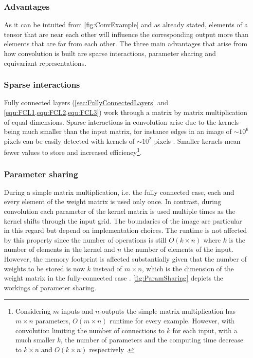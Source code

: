 \subsubsection{Advantages}
As it can be intuited from \cref{fig:ConvExample} and as already stated, elements of a tensor that are near each other will influence the corresponding output more than elements that are far from each other. The three main advantages that arise from how convolution is built are sparse interactions, parameter sharing and equivariant representations. 
\subsubsection{Sparse interactions}
Fully connected layers (\cref{sec:FullyConnectedLayers} and \cref{equ:FCL1,equ:FCL2,equ:FCL3}) work through a matrix by matrix multiplication of equal dimensions. Sparse interactions in convolution arise due to the kernels being much smaller than the input matrix, for instance edges in an image of $\sim10^6$ pixels can be easily detected with kernels of $\sim10^2$ pixels \citep{Goodfellow2016}. Smaller kernels mean fewer values to store and increased efficiency\footnote{Considering $m$ inputs and $n$ outputs the simple matrix multiplication has $m\times n$ parameters, $O(m \times n)$ runtime for every example. However, with convolution limiting the number of connections to $k$ for each input, with a much smaller $k$, the number of parameters and the computing time decrease to $k\times n$ and $O(k\times n)$ respectively \citep{Goodfellow2016}.}.

\subsubsection{Parameter sharing}
During a simple matrix multiplication, i.e. the fully connected case, each and every element of the weight matrix is used only once. In contrast, during convolution each parameter of the kernel matrix is used multiple times as the kernel shifts through the input grid. The boundaries of the image are particular in this regard but depend on implementation choices. The runtime is not affected by this property since the number of operations is still $O(k\times n)$ where $k$ is the number of elements in the kernel and $n$ the number of elements of the input. However, the memory footprint is affected substantially given that the number of weights to be stored is now $k$ instead of $m \times n$, which is the dimension of the weight matrix in the fully-connected case \citep{Goodfellow2016}. \cref{fig:ParamSharing} depicts the workings of parameter sharing.

